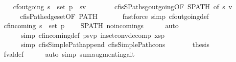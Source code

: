 \begin{isabellebody}
\ \ \isamarkupfalse%
\ {\isachardoublequoteopen}cf{\isachardot}outgoing\ s\ {\isasyminter}\ set\ p\ {\isacharequal}\ {\isacharbraceleft}{\isacharparenleft}s{\isacharcomma}v{\isacharparenright}{\isacharbraceright}{\isachardoublequoteclose}\ \ \isanewline
\ \ \ \ \isamarkupfalse%
\ cf{\isachardot}isSPath{\isacharunderscore}sg{\isacharunderscore}outgoing{\isacharbrackleft}OF\ SPATH{\isacharcomma}\ of\ s\ v{\isacharbrackright}\ \isanewline
\ \ \ \ \isamarkupfalse%
\ cf{\isachardot}isPath{\isacharunderscore}edgeset{\isacharbrackleft}OF\ PATH{\isacharbrackright}\ \isanewline
\ \ \ \ \isamarkupfalse%
\ {\isacharparenleft}fastforce\ simp{\isacharcolon}\ cf{\isachardot}outgoing{\isacharunderscore}def{\isacharparenright}\isanewline
\ \ \isamarkupfalse%
\ \isamarkupfalse%
\ {\isachardoublequoteopen}cf{\isachardot}incoming\ s\ {\isasyminter}\ set\ p\ {\isacharequal}\ {\isacharbraceleft}{\isacharbraceright}{\isachardoublequoteclose}\ \isamarkupfalse%
\ SPATH\ no{\isacharunderscore}incoming{\isacharunderscore}s\isanewline
\ \ \ \ \isamarkupfalse%
\ {\isacharparenleft}auto\ \isanewline
\ \ \ \ \ \ simp{\isacharcolon}\ cf{\isachardot}incoming{\isacharunderscore}def\ {\isacartoucheopen}p{\isacharequal}{\isacharparenleft}s{\isacharcomma}v{\isacharparenright}{\isacharhash}p{\isacharprime}{\isacartoucheclose}\ in{\isacharunderscore}set{\isacharunderscore}conv{\isacharunderscore}decomp{\isacharbrackleft}\ xs{\isacharequal}p{\isacharprime}{\isacharbrackright}\isanewline
\ \ \ \ \ \ simp{\isacharcolon}\ cf{\isachardot}isSimplePath{\isacharunderscore}append\ cf{\isachardot}isSimplePath{\isacharunderscore}cons{\isacharparenright}\ \ \isanewline
\ \ \isamarkupfalse%
\ \isamarkupfalse%
\ {\isacharquery}thesis\isanewline
\ \ \ \ \isamarkupfalse%
\ f{\isachardot}val{\isacharunderscore}def\isanewline
\ \ \ \ \isamarkupfalse%
\ {\isacharparenleft}auto\ simp{\isacharcolon}\ sum{\isacharunderscore}augmenting{\isacharunderscore}alt{\isacharparenright}\isanewline
{}\isamarkupfalse%
%
\endisatagproof
{\isafoldproof}%
%
\isadelimproof
\ \ \ \ \isanewline
%
\endisadelimproof
\isanewline
{}\isamarkupfalse%
\ %
\isanewline
%
\isadelimtheory
%
\endisadelimtheory
%
\isatagtheory
{}\isamarkupfalse%
\ %
%
\endisatagtheory
{\isafoldtheory}%
%
\isadelimtheory
%
\endisadelimtheory
%
\end{isabellebody}%

